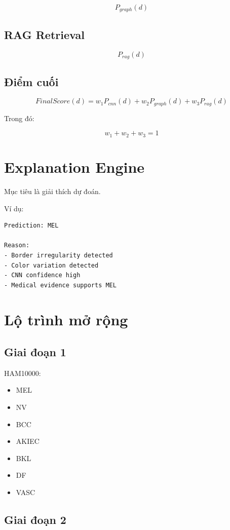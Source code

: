 \documentclass[12pt,a4paper]{article}
\begin{document}
\[
P_{graph}(d)
\]

\subsection{RAG Retrieval}

\[
P_{rag}(d)
\]

\subsection{Điểm cuối}

\[
FinalScore(d)
=
w_1P_{cnn}(d)
+
w_2P_{graph}(d)
+
w_3P_{rag}(d)
\]

Trong đó:

\[
w_1+w_2+w_3=1
\]

\section{Explanation Engine}

Mục tiêu là giải thích dự đoán.

Ví dụ:

\begin{verbatim}
Prediction: MEL

Reason:
- Border irregularity detected
- Color variation detected
- CNN confidence high
- Medical evidence supports MEL
\end{verbatim}

\section{Lộ trình mở rộng}

\subsection{Giai đoạn 1}

HAM10000:

\begin{itemize}
\item MEL
\item NV
\item BCC
\item AKIEC
\item BKL
\item DF
\item VASC
\end{itemize}

\subsection{Giai đoạn 2}
\end{document}
